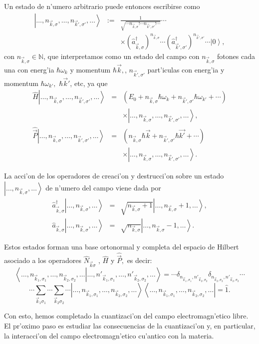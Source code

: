 Un estado de n'umero arbitrario puede entonces escribirse como
\begin{eqnarray}
\left| \dots,n_{\vec{k},\sigma},\dots,n_{\vec{k}',\sigma'},\dots\right>
&:=&\frac{1}{\sqrt{\cdots n_{\vec{k},\sigma}!\cdots
n_{\vec{k}',\sigma'}!\cdots}}\cdots \nonumber\\
&&\times\left( \hat{a}_{\vec{k},\sigma}^{\dagger}\right)
^{n_{\vec{k},\sigma}}\cdots\left( \hat{a}_{\vec{k}',\sigma'}^{\dagger}\right)
^{n_{\vec{k}',\sigma'}}\cdots\left| 0\right> ,
\end{eqnarray}
con $n_{\vec{k},\sigma}\in \mathbb{N}$, que interpretamos como un estado del
campo con $n_{\vec{k},\sigma}$ fotones cada una con energ'ia $\hbar\omega_{k}$
y momentum $\hbar \vec{k},$, $n_{\vec{k}',\sigma'}$ part'iculas con energ'ia y
momentum $\hbar\omega_{k'},$ $\hbar \vec{k}'$, etc, ya que
\begin{eqnarray}
\hat{H}\left| \dots,n_{\vec{k},\sigma},\dots,n_{\vec{k}',\sigma'},\dots\right>
&=& \left( E_0+n_{\vec{k},\sigma} \hbar\omega_k +n_{\vec{k}',\sigma'}
\hbar\omega_{k'}+\cdots\right) \nonumber\\
&&\times \left| \dots,n_{\vec{k},\sigma},\dots,n_{\vec{k}',\sigma'},\dots\right>
,\\
\hat{\vec{P}}\left|
\dots,n_{\vec{k},\sigma},\dots,n_{\vec{k}',\sigma'},\dots\right> &=& 
\left(n_{\vec{k},\sigma} \hbar \vec{k} +n_{\vec{k}',\sigma'} \hbar
\vec{k'}+\cdots\right) \nonumber\\
&&\times\left| \dots,n_{\vec{k},\sigma},\dots,n_{\vec{k}',\sigma'},\dots\right>
.
\end{eqnarray}

La acci'on de los operadores de creaci'on y destrucci'on sobre un estado $\left|
\dots,n_{\vec{k},\sigma},\dots\right>$ de n'umero del campo viene dada por
\begin{eqnarray}
\hat{a}_{\vec{k},\sigma}^{\dagger}\left| \dots,n_{\vec{k},\sigma},\dots\right> &
= &\sqrt{n_{\vec{k},\sigma}+1}\left| \dots,n_{\vec{k},\sigma}+1,\dots\right> ,\\
\hat{a}_{\vec{k},\sigma}\left| \dots,n_{\vec{k},\sigma},\dots\right> & =
&\sqrt{n_{\vec{k},\sigma}}\left|
\dots,n_{\vec{k},\sigma}-1,\dots\right> .
\end{eqnarray}


Estos estados forman una base ortonormal y completa del espacio de Hilbert
asociado a los operadores $\hat{N}_{\vec{k}\sigma}$ , $\hat{H}$ y
$\hat{\vec{P}},$ es decir:%
\begin{equation}
\left\langle 
\dots,n_{\vec{k}_1,\sigma_1},\dots,n_{\vec{k}_2,\sigma_2},\dots\right| \left. 
\dots,n'_{\vec{k}_1,\sigma_1},\dots,n'_{\vec{k}_2,\sigma_2},\dots\right>  =
\cdots\delta_{n_{\vec{k}_1,\sigma_1},n'_{\vec{k}_2,\sigma_2}}\delta_{n_{\vec{k}
_2,\sigma_2},n'_{\vec{k}_2,\sigma_2}}\cdots
\end{equation} 
\begin{equation}
\cdots\sum_{\vec{k}_1\sigma_1}\cdots\sum_{\vec{k}_2\sigma_2}\cdots\left|
\dots,n_{\vec{k}_1,\sigma_1},\dots,n_{\vec{k}_2,\sigma_2},\dots\right>
\left\langle
\dots,n_{\vec{k}_1,\sigma_1},\dots,n_{\vec{k}_2,\sigma_2},\dots\right|  =
\hat{1}.
\end{equation} 

Con esto, hemos completado la cuantizaci'on del campo electromagn'etico libre.
El pr'oximo paso es estudiar las consecuencias de la cuantizaci'on y, en
particular, la interacci'on del campo electromagn'etico cu'antico con la
materia.
